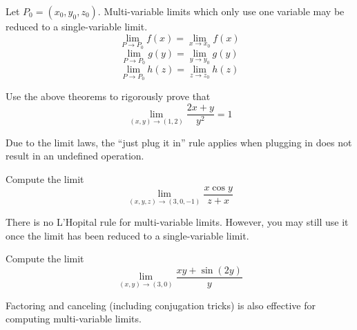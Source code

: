 \documentclass[letterpaper, twoside, 12pt]{book}
\begin{document}
\begin{theorem}
  Let $P_0=(x_0,y_0,z_0)$. Multi-variable limits which only use one
  variable may be reduced to a single-variable limit.
    \[
      \lim_{P\to P_0}f(x) = \lim_{x\to x_0}f(x)
    \]
    \[
      \lim_{P\to P_0}g(y) = \lim_{y\to y_0}g(y)
    \]
    \[
      \lim_{P\to P_0}h(z) = \lim_{z\to z_0}h(z)
    \]
\end{theorem}

          \begin{problem}
            Use the above theorems to rigorously prove that
              \[
                \lim_{(x,y)\to(1,2)}
                \frac{2x+y}{y^2}
                  =
                1
              \]
          \end{problem}

          \begin{solution}

          \end{solution}

\begin{remark}
  Due to the limit laws, the ``just plug it in'' rule applies when
  plugging in does not result in an undefined operation.
\end{remark}

          \begin{problem}
            Compute the limit
              \[
                \lim_{(x,y,z)\to(3,0,-1)}
                \frac{x\cos y}{z+x}
              \]
          \end{problem}

\begin{remark}
  There is no L'Hopital rule for multi-variable limits.
  However, you may still use it once the limit has been reduced
  to a single-variable limit.
\end{remark}

          \begin{problem}
            Compute the limit
              \[
                \lim_{(x,y)\to(3,0)}
                \frac{xy+\sin(2y)}{y}
              \]
          \end{problem}

          \begin{solution}

          \end{solution}

\begin{remark}
  Factoring and canceling (including conjugation tricks) is
  also effective for computing multi-variable limits.
\end{remark}
\end{document}
